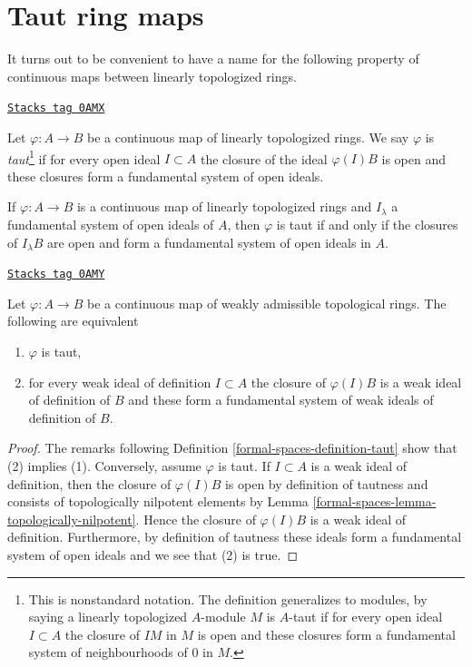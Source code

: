 \section{Taut ring maps}
\label{formal-spaces-section-taut-ring-maps}
It turns out to be convenient to have a name for the following property
of continuous maps between linearly topologized rings.

\begin{definition}[Taut]
\label{formal-spaces-definition-taut}
\href{https://stacks.math.columbia.edu/tag/0AMX}{\texttt{Stacks tag 0AMX}}

Let $\varphi : A \to B$ be a continuous map of linearly topologized rings.
We say $\varphi$ is {\it taut}\footnote{This is nonstandard notation.
The definition generalizes to modules, by saying a linearly topologized
$A$-module $M$ is $A$-taut if for every open ideal $I \subset A$ the closure
of $IM$ in $M$ is open and these closures form a fundamental system of
neighbourhoods of $0$ in $M$.}
if for every open ideal $I \subset A$ the closure of the ideal $\varphi(I)B$
is open and these closures form a fundamental system of open ideals.
\end{definition}

If $\varphi : A \to B$ is a continuous map of linearly topologized rings
and $I_\lambda$ a fundamental system of open ideals of $A$, then $\varphi$
is taut if and only if
the closures of $I_\lambda B$ are open and form a fundamental
system of open ideals in $A$.

\begin{lemma}
\label{formal-spaces-lemma-taut-weakly-admissible}
\href{https://stacks.math.columbia.edu/tag/0AMY}{\texttt{Stacks tag 0AMY}}

Let $\varphi : A \to B$ be a continuous map of weakly admissible topological
rings. The following are equivalent
\begin{enumerate}
\item $\varphi$ is taut,
\item for every weak ideal of definition $I \subset A$ the closure of
$\varphi(I)B$ is a weak ideal of definition of $B$ and these form a
fundamental system of weak ideals of definition of $B$.
\end{enumerate}
\end{lemma}

\begin{proof}
The remarks following Definition \ref{formal-spaces-definition-taut} show that
(2) implies (1). Conversely, assume $\varphi$ is taut. If $I \subset A$
is a weak ideal of definition, then the closure of $\varphi(I)B$
is open by definition of tautness and consists of topologically
nilpotent elements by Lemma \ref{formal-spaces-lemma-topologically-nilpotent}.
Hence the closure of $\varphi(I)B$ is a weak ideal of definition.
Furthermore, by definition of tautness these ideals form a
fundamental system of open ideals and we see that (2) is true.
\end{proof}

